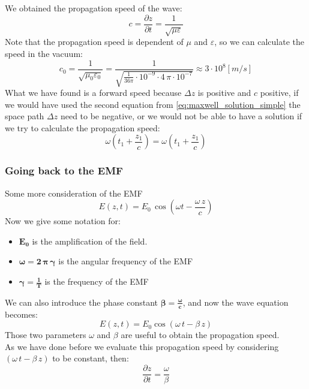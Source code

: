 We obtained the propagation speed of the wave:
\begin{equation}
    c=\frac{\partial z}{\partial t}=\frac{1}{\sqrt{\mu \varepsilon}}
\end{equation}
Note that the propagation speed is dependent of $\mu$ and $\varepsilon$, so we can calculate the speed in the vacuum:
\begin{equation}
    c_0=\frac{1}{\sqrt{\mu_0 \varepsilon_0}}=\frac{1}{\sqrt{\frac{1}{36\pi}\cdot 10^{-9}\cdot 4\,\pi\cdot 10^{-7}}}\approx 3\cdot 10^{8}[m/s]
\end{equation}
What we have found is a forward speed because $\Delta z$ is positive and $c$ positive, if we would have used the second equation from \cref{eq:maxwell_solution_simple} the space path $\Delta z$ need to be negative, or we would not be able to have a solution if we try to calculate the propagation speed:
\begin{equation}
    \omega\left(t_1+\frac{z_1}{c}\right)=\omega\left(t_1+\frac{z_1}{c}\right)
\end{equation}
\subsubsection*{Going back to the EMF}
Some more consideration of the EMF
\begin{equation}
    E(z,t)=E_0\,\cos(\omega t-\frac{\omega\,z}{c})
\end{equation}
Now we give some notation for:
\begin{itemize}
    \item $\bm{E_0}$ is the amplification of the field.
    \item $\bm{\omega=2\,\pi\,\gamma} $ is the angular frequency of the EMF
    \item $\bm{\gamma=\frac{1}{T}}$ is the frequency of the EMF
\end{itemize}
We can also introduce the phase constant $\bm{\beta=\frac{\omega}{c}}$, and now the wave equation becomes:
\begin{equation}\label{eq:E_with_phase_constant}
    E(z,t)=E_0\cos(\omega\, t-\beta\,z)
\end{equation}
Those two parameters $\omega$ and $\beta$ are useful to obtain the propagation speed.\\
As we have done before we evaluate this propagation speed by considering $(\omega \,t-\beta \,z)$ to be constant, then:
\begin{equation}
    \frac{\partial z}{\partial t}=\frac{\omega}{\beta}
\end{equation}
